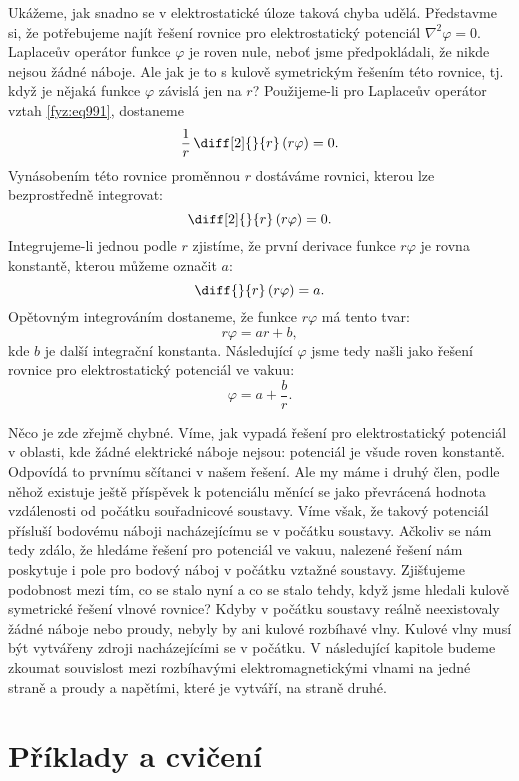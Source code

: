    Ukážeme, jak snadno se v elektrostatické úloze taková chyba udělá. Představme si, že potřebujeme
    najít řešení rovnice pro elektrostatický potenciál \(\nabla^2\varphi = 0\). Laplaceův operátor
    funkce \(\varphi\) je roven nule, neboť jsme předpokládali, že nikde nejsou žádné náboje. Ale
    jak je to s kulově symetrickým řešením této rovnice, tj. když je nějaká funkce \(\varphi\)
    závislá jen na \(r\)? Použijeme-li pro Laplaceův operátor vztah \eqref{fyz:eq991}, dostaneme
    \begin{equation*}
      \dfrac{1}{r}\,\diff[2]{ }{r}\,(r\varphi)=0.
    \end{equation*}
    Vynásobením této rovnice proměnnou \(r\) dostáváme rovnici, kterou lze bezprostředně integrovat:
    \begin{equation*}
      \diff[2]{ }{r}\,(r\varphi)=0.
    \end{equation*}
    Integrujeme-li jednou podle \(r\) zjistíme, že první derivace funkce \(r\varphi\) je rovna
    konstantě, kterou můžeme označit \(a\):
    \begin{equation*}
      \diff{}{r}\,(r\varphi)=a.
    \end{equation*}
    Opětovným integrováním dostaneme, že funkce \(r\varphi\) má tento tvar:
    \begin{equation*}
      r\varphi=ar+b,
    \end{equation*}
    kde \(b\) je další integrační konstanta. Následující \(\varphi\) jsme tedy našli jako řešení
    rovnice pro elektrostatický potenciál ve vakuu:
    \begin{equation*}
      \varphi=a+\dfrac{b}{r}.
    \end{equation*}

    Něco je zde zřejmě chybné. Víme, jak vypadá řešení pro elektrostatický potenciál v oblasti, kde
    žádné elektrické náboje nejsou: potenciál je všude roven konstantě. Odpovídá to prvnímu sčítanci
    v našem řešení. Ale my máme i druhý člen, podle něhož existuje ještě příspěvek k potenciálu
    měnící se jako převrácená hodnota vzdálenosti od počátku souřadnicové soustavy. Víme však, že
    takový potenciál přísluší bodovému náboji nacházejícímu se v počátku soustavy. Ačkoliv se nám
    tedy zdálo, že hledáme řešení pro potenciál ve vakuu, nalezené řešení nám poskytuje i pole pro
    bodový náboj v počátku vztažné soustavy. Zjišťujeme podobnost mezi tím, co se stalo nyní a co se
    stalo tehdy, když jsme hledali kulově symetrické řešení vlnové rovnice? Kdyby v počátku soustavy
    reálně neexistovaly žádné náboje nebo proudy, nebyly by ani kulové rozbíhavé vlny. Kulové vlny
    musí být vytvářeny zdroji nacházejícími se v počátku. V následující kapitole budeme zkoumat
    souvislost mezi rozbíhavými elektromagnetickými vlnami na jedné straně a proudy a napětími,
    které je vytváří, na straně druhé.


  \section{Příklady a cvičení}\label{fyz:IIchapXXsecV}

